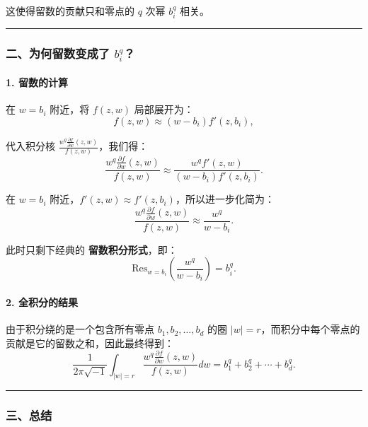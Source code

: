 \documentclass[lang=cn,zihao=-4,fontset=none,twoside]{fancybook}
\begin{document}
这使得留数的贡献只和零点的 \(q\) 次幂 \(b_i^q\) 相关。

\begin{center}\rule{0.5\linewidth}{0.5pt}\end{center}

\hypertarget{ux4e8cux4e3aux4f55ux7559ux6570ux53d8ux6210ux4e86-b_iq}{%
\subsubsection{\texorpdfstring{二、为何留数变成了
\(b_i^q\)？}{二、为何留数变成了 b\_i\^{}q？}}\label{ux4e8cux4e3aux4f55ux7559ux6570ux53d8ux6210ux4e86-b_iq}}

\hypertarget{ux7559ux6570ux7684ux8ba1ux7b97}{%
\paragraph{1. 留数的计算}\label{ux7559ux6570ux7684ux8ba1ux7b97}}

在 \(w = b_i\) 附近，将 \(f(z, w)\) 局部展开为：
\[
f(z, w) \approx (w - b_i) f'(z, b_i),
\]
         
代入积分核
\(\frac{w^q \frac{\partial f}{\partial w}(z, w)}{f(z, w)}\)，我们得：
\[
\frac{w^q \frac{\partial f}{\partial w}(z, w)}{f(z, w)} \approx \frac{w^q f'(z, w)}{(w - b_i) f'(z, b_i)}.
\]

在 \(w = b_i\) 附近，\(f'(z, w) \approx f'(z, b_i)\)，所以进一步化简为：
\[
\frac{w^q \frac{\partial f}{\partial w}(z, w)}{f(z, w)} \approx \frac{w^q}{w - b_i}.
\]

此时只剩下经典的 \textbf{留数积分形式}，即：
\[
\text{Res}_{w = b_i} \left(\frac{w^q}{w - b_i}\right) = b_i^q.
\]

\hypertarget{ux5168ux79efux5206ux7684ux7ed3ux679c}{%
\paragraph{2. 全积分的结果}\label{ux5168ux79efux5206ux7684ux7ed3ux679c}}

由于积分绕的是一个包含所有零点 \(b_1, b_2, \dots, b_d\) 的圈
\(|w| = r\)，而积分中每个零点的贡献是它的留数之和，因此最终得到：
\[
\frac{1}{2\pi \sqrt{-1}} \int_{|w| = r} \frac{w^q \frac{\partial f}{\partial w}(z, w)}{f(z, w)} dw = b_1^q + b_2^q + \cdots + b_d^q.
\]

\begin{center}\rule{0.5\linewidth}{0.5pt}\end{center}

\hypertarget{ux4e09ux603bux7ed3}{%
\subsubsection{三、总结}\label{ux4e09ux603bux7ed3}}
\end{document}
